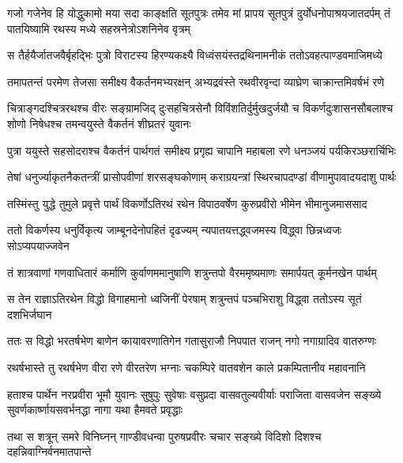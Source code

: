 \sixlineindentedshloka
{गजो गजेनेव हि योद्धुकामो}
{मया सदा काङ्क्षति सूतपुत्रः}
{तमेव मां प्रापय सूतपुत्रं}
{दुर्योधनोपाश्रयजातदर्पम्}
{तं पातयिष्यामि रथस्य मध्ये}
{सहस्रनेत्रोऽशनिनेव वृत्रम्}



\fourlineindentedshloka
{स तैर्हयैर्जातजवैर्बृहद्भिः}
{पुत्रो विराटस्य हिरण्यकक्ष्यै}
{विध्वंसयंस्तद्रथिनामनीकं}
{ततोऽवहत्पाण्डवमाजिमध्ये}


\fourlineindentedshloka
{तमापतन्तं परमेण तेजसा}
{समीक्ष्य वैकर्तनमभ्यरक्षन्}
{अभ्यद्रवंस्ते रथवीरवृन्दा}
{व्याघ्रेण चाक्रान्तमिवर्षभं रणे}


\sixlineindentedshloka
{चित्राङ्गदश्चित्ररथश्च वीरः}
{सङ्ग्रामजिद् दुःसहचित्रसेनौ}
{विविंशतिर्दुर्मुखदुर्जयौ च}
{विकर्णदुःशासनसौबलाश्च}
{शोणो निषेधश्च तमन्वयुस्ते}
{वैकर्तनं शीघ्रतरं युवानः}


\fourlineindentedshloka
{पुत्रा ययुस्ते सहसोदराश्च}
{वैकर्तनं पार्थगतं समीक्ष्य}
{प्रगृह्य चापानि महाबला रणे}
{धनञ्जयं पर्यकिरञ्छरार्चिभिः}


\fourlineindentedshloka
{तेषां धनुर्ज्याकृतनैकतन्त्रीं}
{प्रासोपवीणां शरसङ्घकोणाम्}
{कराग्रयन्त्रां स्थिरचापदण्डां}
{वीणामुपावादयदाशु पार्थः}


\fourlineindentedshloka
{तस्मिंस्तु युद्धे तुमुले प्रवृत्ते}
{पार्थं विकर्णोऽतिरथं रथेन}
{विपाठवर्षेण कुरुप्रवीरो}
{भीमेन भीमानुजमाससाद}


\fourlineindentedshloka
{ततो विकर्णस्य धनुर्विकृत्य}
{जाम्बूनदेनोपहितं दृढज्यम्}
{न्यपातयत्तद्ध्वजमस्य विद्ध्वा}
{छिन्नध्वजः सोऽप्यपयाज्जवेन}


\fourlineindentedshloka
{तं शात्रवाणां गणवाधितारं}
{कर्माणि कुर्वाणममानुषाणि}
{शत्रुन्तपो वैरममृष्यमाणः}
{समार्पयत् कूर्मनखेन पार्थम्}


\fourlineindentedshloka
{स तेन राज्ञाऽतिरथेन विद्धो}
{विगाहमानो ध्वजिनीं पेरषाम्}
{शत्रुन्तपं पञ्चभिराशु विद्ध्वा}
{ततोऽस्य सूतं दशभिर्जघान}


\fourlineindentedshloka
{ततः स विद्धो भरतर्षभेण}
{बाणेन कायावरणातिगेन}
{गतासुराजौ निपपात राजन्}
{नगो नगाग्रादिव वातरुग्णः}


\fourlineindentedshloka
{रथर्षभास्ते तु रथर्षभेण}
{वीरा रणे वीरतरेण भग्नाः}
{चकम्पिरे वातवशेन काले}
{प्रकम्पितानीव महावनानि}


\sixlineindentedshloka
{हताश्च पार्थेन नरप्रवीरा}
{भूमौ युवानः सुषुपुः सुवेषाः}
{वसुप्रदा वासवतुल्यवीर्याः}
{पराजिता वासवजेन सङ्ख्ये}
{सुवर्णकार्ष्णायसवर्भनद्धा}
{नागा यथा हैमवते प्रवृद्धाः}


\fourlineindentedshloka
{तथा स शत्रून् समरे विनिघ्नन्}
{गाण्डीवधन्वा पुरुषप्रवीरः}
{चचार सङ्ख्ये विदिशो दिशश्च}
{दहन्निवाग्निर्वनमातपान्ते}


